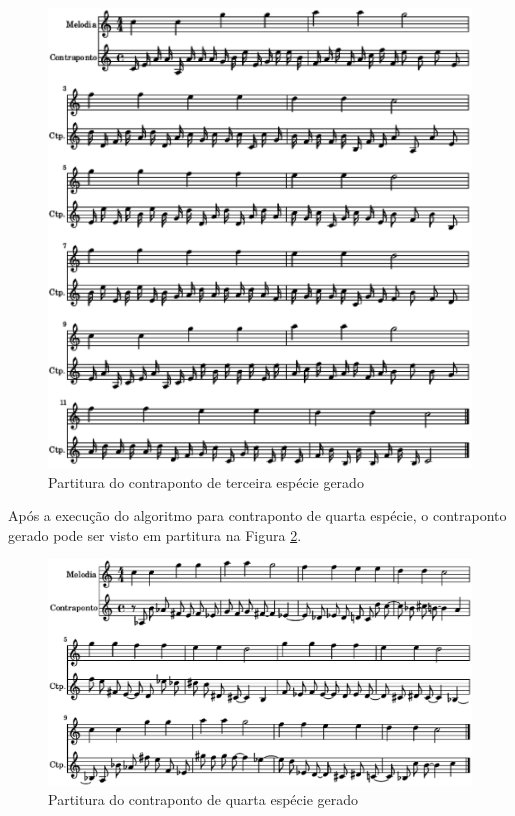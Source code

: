     \begin{figure}[htb]
      \centering
      \includegraphics[scale=0.6]{figuras/cont3.2.eps}
      \caption{Partitura do contraponto de terceira espécie gerado}
      \label{cont3.2}
    \end{figure}

    Após a execução do algoritmo para contraponto de quarta espécie, o contraponto gerado pode ser visto em partitura na Figura \ref{cont4.2}.

    \begin{figure}[htb]
      \centering
      \includegraphics[scale=0.6]{figuras/cont4.2.eps}
      \caption{Partitura do contraponto de quarta espécie gerado}
      \label{cont4.2}
    \end{figure}
